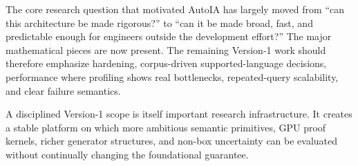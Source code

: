 \documentclass[11pt]{article}
\begin{document}
The core research question that motivated AutoIA has largely moved from
``can this architecture be made rigorous?'' to ``can it be made broad, fast, and
predictable enough for engineers outside the development effort?''  The major
mathematical pieces are now present.  The remaining Version-1 work should
therefore emphasize hardening, corpus-driven supported-language decisions,
performance where profiling shows real bottlenecks, repeated-query scalability,
and clear failure semantics.

A disciplined Version-1 scope is itself important research infrastructure.  It
creates a stable platform on which more ambitious semantic primitives, GPU proof
kernels, richer generator structures, and non-box uncertainty can be evaluated
without continually changing the foundational guarantee.
\end{document}
